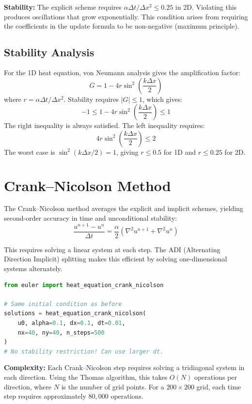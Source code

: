 \textbf{Stability:} The explicit scheme requires $\alpha \Delta t / \Delta x^2 \leq 0.25$ in 2D.
Violating this produces oscillations that grow exponentially. This condition arises from
requiring the coefficients in the update formula to be non-negative (maximum principle).

\subsection{Stability Analysis}

For the 1D heat equation, von Neumann analysis gives the amplification factor:
\[
G = 1 - 4r \sin^2\left(\frac{k \Delta x}{2}\right)
\]
where $r = \alpha \Delta t / \Delta x^2$. Stability requires $|G| \leq 1$, which gives:
\[
-1 \leq 1 - 4r \sin^2\left(\frac{k \Delta x}{2}\right) \leq 1
\]
The right inequality is always satisfied. The left inequality requires:
\[
4r \sin^2\left(\frac{k \Delta x}{2}\right) \leq 2
\]
The worst case is $\sin^2(k\Delta x/2) = 1$, giving $r \leq 0.5$ for 1D and $r \leq 0.25$ for 2D.

\section{Crank--Nicolson Method}

The Crank--Nicolson method averages the explicit and implicit schemes, yielding second-order
accuracy in time and unconditional stability:
\[
\frac{u^{n+1} - u^n}{\Delta t} = \frac{\alpha}{2} \left( \nabla^2 u^{n+1} + \nabla^2 u^n \right)
\]

This requires solving a linear system at each step. The ADI (Alternating Direction Implicit)
splitting makes this efficient by solving one-dimensional systems alternately.

\begin{lstlisting}[language=Python, caption=Crank-Nicolson solver]
from euler import heat_equation_crank_nicolson

# Same initial condition as before
solutions = heat_equation_crank_nicolson(
    u0, alpha=0.1, dx=0.1, dt=0.01,
    nx=40, ny=40, n_steps=500
)
# No stability restriction! Can use larger dt.
\end{lstlisting}

\textbf{Complexity:} Each Crank--Nicolson step requires solving a tridiagonal system in each
direction. Using the Thomas algorithm, this takes $O(N)$ operations per direction, where $N$
is the number of grid points. For a $200 \times 200$ grid, each time step requires approximately
$80{,}000$ operations.

